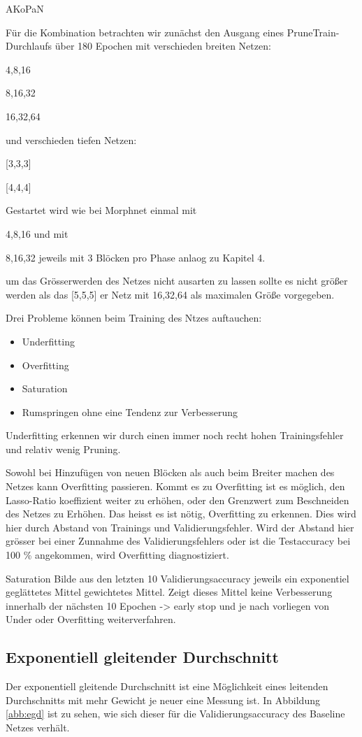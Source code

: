 AKoPaN

Für die Kombination betrachten wir zunächst den Ausgang eines PruneTrain-Durchlaufs über 180 Epochen mit verschieden breiten Netzen:

4,8,16


8,16,32


16,32,64


und verschieden tiefen Netzen:

[3,3,3]


[4,4,4]




Gestartet wird wie bei Morphnet einmal mit 


4,8,16 und mit 


8,16,32
jeweils mit 3 Blöcken pro Phase
anlaog zu Kapitel 4.


um das Grösserwerden des Netzes nicht ausarten zu lassen sollte es nicht größer werden als 
das [5,5,5] er Netz mit 16,32,64 als maximalen Größe vorgegeben.




Drei Probleme können beim Training des Ntzes auftauchen:
\begin{itemize}
 \item Underfitting
 \item Overfitting
 \item Saturation
 \item Rumspringen ohne eine Tendenz zur Verbesserung
\end{itemize}

Underfitting erkennen wir durch einen immer noch recht hohen Trainingsfehler und relativ wenig Pruning.


Sowohl bei Hinzufügen von neuen Blöcken als auch beim Breiter machen des Netzes kann Overfitting passieren. Kommt es zu Overfitting ist es möglich, den Lasso-Ratio koeffizient weiter zu erhöhen, oder den Grenzwert zum Beschneiden des Netzes zu Erhöhen. Das heisst es ist nötig, Overfitting zu erkennen. Dies wird hier durch Abstand von Trainings und Validierungsfehler. Wird der Abstand hier grösser bei einer Zunnahme des Validierungsfehlers oder  ist die Testaccuracy bei 100 \% angekommen, wird Overfitting diagnostiziert.


Saturation
Bilde aus den letzten 10 Validierungsaccuracy jeweils ein exponentiel geglättetes Mittel gewichtetes Mittel. Zeigt dieses Mittel keine Verbesserung innerhalb der nächsten 10 Epochen -> early stop und je nach vorliegen von Under oder Overfitting weiterverfahren.

\subsection{Exponentiell gleitender Durchschnitt}
Der exponentiell gleitende Durchschnitt ist eine Möglichkeit eines leitenden Durchschnitts mit mehr Gewicht je neuer eine Messung ist. In Abbildung \ref{abb:egd} ist zu sehen, wie sich dieser für die Validierungsaccuracy des Baseline Netzes verhält.

